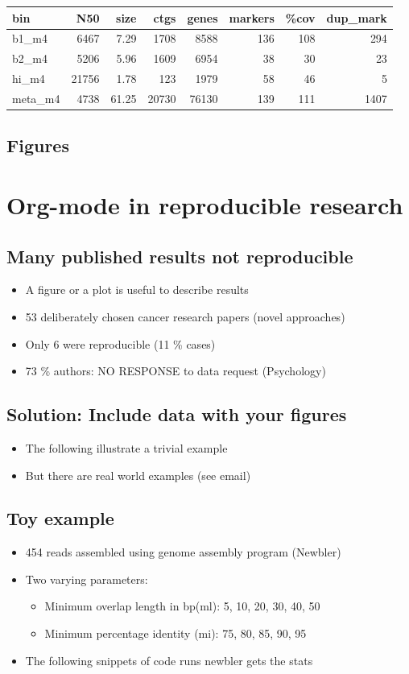 \documentclass[a4paper, twoside]{article}
\begin{document}
\begin{center}
\begin{tabular}{lrrrrrrr}
\hline
bin & N50 & size & ctgs & genes & markers & \%cov & dup\_mark\\
\hline
b1\_m4 & 6467 & 7.29 & 1708 & 8588 & 136 & 108 & 294\\
b2\_m4 & 5206 & 5.96 & 1609 & 6954 & 38 & 30 & 23\\
hi\_m4 & 21756 & 1.78 & 123 & 1979 & 58 & 46 & 5\\
meta\_m4 & 4738 & 61.25 & 20730 & 76130 & 139 & 111 & 1407\\
\hline
\end{tabular}
\end{center}

\subsection{Figures}
\label{sec:orgcc84880}
\section{Org-mode in reproducible research}
\label{sec:org1202360}
\subsection{Many published results not reproducible}
\label{sec:org8cee4a}
\begin{itemize}
\item A figure or a plot is useful to describe results
\item 53 deliberately chosen cancer research papers (novel approaches)
\item Only 6 were reproducible (11 \% cases)
\item 73 \% authors: NO RESPONSE to data request (Psychology)
\end{itemize}
\subsection{Solution: Include data with your figures}
\label{sec:org4fd6e54}
\begin{itemize}
\item The following illustrate a trivial example
\item But there are real world examples (see email)
\end{itemize}
\subsection{Toy example}
\label{sec:orgac521a}
\begin{itemize}
\item 454 reads assembled using genome assembly program (Newbler)
\item Two varying parameters:
\begin{itemize}
\item Minimum overlap length in bp(ml): 5, 10, 20, 30, 40, 50
\item Minimum percentage identity (mi): 75, 80, 85, 90, 95
\end{itemize}
\item The following snippets of code runs newbler gets the stats
\end{itemize}
\end{document}
